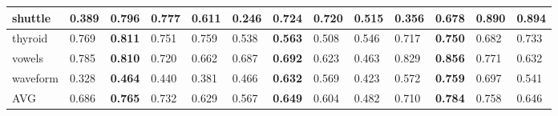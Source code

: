 \begin{table}[]
{\begin{tabular}{|l|llll|llllllll|}
shuttle           & \multicolumn{1}{l|}{0.389}          & \multicolumn{1}{l|}{\textbf{0.796}} & \multicolumn{1}{l|}{0.777}          & 0.611 & \multicolumn{1}{l|}{0.246}          & \multicolumn{1}{l|}{\textbf{0.724}} & \multicolumn{1}{l|}{0.720}          & \multicolumn{1}{l|}{0.515} & \multicolumn{1}{l|}{0.356}          & \multicolumn{1}{l|}{0.678}          & \multicolumn{1}{l|}{0.890}          & \textbf{0.894} \\ \hline
thyroid           & \multicolumn{1}{l|}{0.769}          & \multicolumn{1}{l|}{\textbf{0.811}} & \multicolumn{1}{l|}{0.751}          & 0.759 & \multicolumn{1}{l|}{0.538}          & \multicolumn{1}{l|}{\textbf{0.563}} & \multicolumn{1}{l|}{0.508}          & \multicolumn{1}{l|}{0.546} & \multicolumn{1}{l|}{0.717}          & \multicolumn{1}{l|}{\textbf{0.750}} & \multicolumn{1}{l|}{0.682}          & 0.733          \\ \hline
vowels            & \multicolumn{1}{l|}{0.785}          & \multicolumn{1}{l|}{\textbf{0.810}} & \multicolumn{1}{l|}{0.720}          & 0.662 & \multicolumn{1}{l|}{0.687}          & \multicolumn{1}{l|}{\textbf{0.692}} & \multicolumn{1}{l|}{0.623}          & \multicolumn{1}{l|}{0.463} & \multicolumn{1}{l|}{0.829}          & \multicolumn{1}{l|}{\textbf{0.856}} & \multicolumn{1}{l|}{0.771}          & 0.632          \\ \hline
waveform          & \multicolumn{1}{l|}{0.328}          & \multicolumn{1}{l|}{\textbf{0.464}} & \multicolumn{1}{l|}{0.440}          & 0.381 & \multicolumn{1}{l|}{0.466}          & \multicolumn{1}{l|}{\textbf{0.632}} & \multicolumn{1}{l|}{0.569}          & \multicolumn{1}{l|}{0.423} & \multicolumn{1}{l|}{0.572}          & \multicolumn{1}{l|}{\textbf{0.759}} & \multicolumn{1}{l|}{0.697}          & 0.541          \\ \hline
AVG         & \multicolumn{1}{l|}{0.686}          & \multicolumn{1}{l|}{\textbf{0.765}} & \multicolumn{1}{l|}{0.732}          & 0.629                 & \multicolumn{1}{l|}{0.567}          & \multicolumn{1}{l|}{\textbf{0.649}} & \multicolumn{1}{l|}{0.604}          & \multicolumn{1}{l|}{0.482} & \multicolumn{1}{l|}{0.710}          & \multicolumn{1}{l|}{\textbf{0.784}} & \multicolumn{1}{l|}{0.758}          & 0.646          \\ \hline

\end{tabular}%
}
\end{table}

